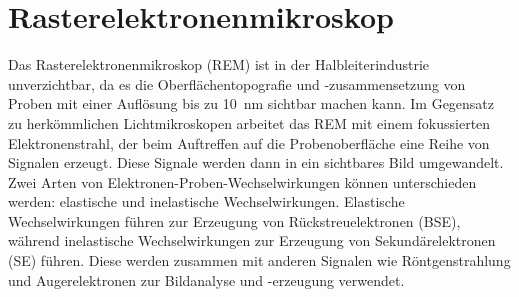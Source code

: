 \section{Rasterelektronenmikroskop}
Das Rasterelektronenmikroskop (REM) ist in der Halbleiterindustrie unverzichtbar, da es die Oberflächentopografie und -zusammensetzung von Proben mit einer Auflösung bis zu \SI{10}{\nano\metre} sichtbar machen kann.
Im Gegensatz zu herkömmlichen Lichtmikroskopen arbeitet das REM mit einem fokussierten Elektronenstrahl, der beim Auftreffen auf die Probenoberfläche eine Reihe von Signalen erzeugt. Diese Signale werden dann in ein sichtbares Bild umgewandelt. Zwei Arten von Elektronen-Proben-Wechselwirkungen können unterschieden werden: elastische und inelastische Wechselwirkungen. Elastische Wechselwirkungen führen zur Erzeugung von Rückstreuelektronen (BSE), während inelastische Wechselwirkungen zur Erzeugung von Sekundärelektronen (SE) führen. Diese werden zusammen mit anderen Signalen wie Röntgenstrahlung und Augerelektronen zur Bildanalyse und -erzeugung verwendet.

